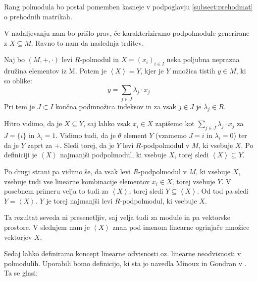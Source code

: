 \documentclass[mat1]{fmfdelo}
\newcommand{\Gen}[1]{\ensuremath{\left<{#1}\right>}}
\begin{document}
Rang polmodula bo postal pomemben kasneje v podpoglavju \ref{subsect:prehodmat} o prehodnih matrikah.

V nadaljevanju nam bo prišlo prav, če karakteriziramo podpolmodule generirane z $X\subseteq M$. Ravno to nam da naslednja trditev.

\begin{trditev}
	Naj bo $(M, +, \cdot)$ levi $R$-polmodul in $X = (x_i)_{i\in I}$ neka poljubna neprazna družina elementov iz M. Potem je $\Gen{X} = Y$, kjer je $Y$  množica tistih $y\in M$, ki so oblike: $$ y = \sum_{j\in J} \lambda_j \cdot x_j$$ Pri tem je $J\subset I$ končna podmnožica indeksov in za vsak $j\in J$ je $\lambda_j \in R$.
\end{trditev}

\begin{dokaz}
	
	Hitro vidimo, da je $X \subseteq Y$, saj lahko vsak $x_i\in X$ zapišemo kot $\sum_{j\in J}\lambda_j\cdot x_j$ za $J = \{i\}$ in $\lambda_i = 1$. Vidimo tudi, da je $\theta$ element $Y$ (vzamemo $J = {i}$ in $\lambda_i = 0$) ter da je $Y$ zaprt za $+$. Sledi torej, da je $Y$ levi $R$-podpolmodul v $M$, ki vsebuje $X$. Po definiciji je $\Gen{X}$ najmanjši podpolmodul, ki vsebuje $X$, torej sledi $\Gen{X} \subseteq Y$. 
	
	Po drugi strani pa vidimo še, da vsak levi $R$-podpolmodul v $M$, ki vsebuje $X$, vsebuje tudi vse linearne kombinacije elementov $x_i\in X$, torej vsebuje $Y$. V posebnem primeru velja to tudi za \Gen{X}, torej sledi $Y \subseteq \Gen{X}$. Od tod pa sledi $Y = \Gen{X}$. $Y$ je torej najmanjši levi $R$-podpolmodul, ki vsebuje $X$.
\end{dokaz}

Ta rezultat seveda ni presenetljiv, saj velja tudi za module in pa vektorske prostore. V slednjem nam je \Gen{X} znan pod imenom linearne ogrinjače množice vektorjev $X$.

Sedaj lahko definiramo koncept linearne odvisnosti oz. linearne neodvisnosti v polmodulih. Uporabili bomo definicijo, ki sta jo navedla Minoux in Gondran v \cite[Poglavje 5, definicija 2.\,5.\,1.\,]{bib:Gondran}. Ta se glasi:
\end{document}
